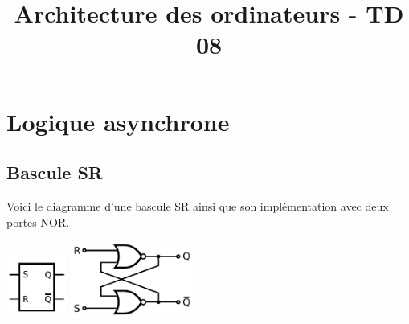 \documentclass[a4paper,10pt]{exam}
\title{Architecture des ordinateurs - TD 08}
\author{}
\date{}
\begin{document}
\maketitle

\section{Logique asynchrone}
\subsection{Bascule SR}

Voici le diagramme d'une bascule SR ainsi que son implémentation avec deux
portes NOR.

\includegraphics[width=2cm]{SRflipflop} \hspace{1cm}\includegraphics[width=4cm]{SR-design}
\end{document}

